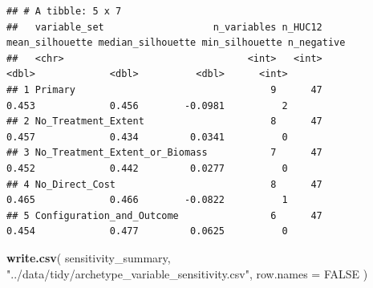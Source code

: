 \documentclass[
]{article}
\newenvironment{Shaded}{\begin{snugshade}}{\end{snugshade}}
\newcommand{\AttributeTok}[1]{\textcolor[rgb]{0.13,0.29,0.53}{#1}}
\newcommand{\ConstantTok}[1]{\textcolor[rgb]{0.56,0.35,0.01}{#1}}
\newcommand{\FunctionTok}[1]{\textcolor[rgb]{0.13,0.29,0.53}{\textbf{#1}}}
\newcommand{\NormalTok}[1]{#1}
\newcommand{\StringTok}[1]{\textcolor[rgb]{0.31,0.60,0.02}{#1}}
\begin{document}
\begin{verbatim}
## # A tibble: 5 x 7
##   variable_set                   n_variables n_HUC12 mean_silhouette median_silhouette min_silhouette n_negative
##   <chr>                                <int>   <int>           <dbl>             <dbl>          <dbl>      <int>
## 1 Primary                                  9      47           0.453             0.456        -0.0981          2
## 2 No_Treatment_Extent                      8      47           0.457             0.434         0.0341          0
## 3 No_Treatment_Extent_or_Biomass           7      47           0.452             0.442         0.0277          0
## 4 No_Direct_Cost                           8      47           0.465             0.466        -0.0822          1
## 5 Configuration_and_Outcome                6      47           0.454             0.477         0.0625          0
\end{verbatim}

\begin{Shaded}
\begin{Highlighting}[]
\FunctionTok{write.csv}\NormalTok{(}
\NormalTok{  sensitivity\_summary,}
  \StringTok{"../data/tidy/archetype\_variable\_sensitivity.csv"}\NormalTok{,}
  \AttributeTok{row.names =} \ConstantTok{FALSE}
\NormalTok{)}
\end{Highlighting}
\end{Shaded}
\end{document}
